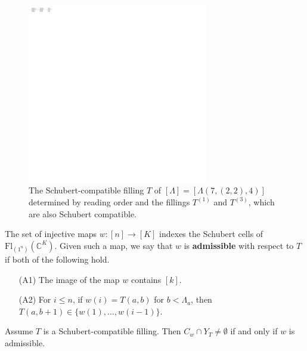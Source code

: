 \documentclass[12pt]{amsart}
\newcommand{\Fl}{\mathrm{Fl}}
\begin{document}
\begin{figure} 
    \centering
    \includegraphics[width=0.7\textwidth]{Figures/ReadingOrder.pdf}
    \caption{The Schubert-compatible filling $T$ of $[\Lambda] = [\Lambda(7,(2,2),4)]$ determined by reading order and the fillings $T^{(1)}$ and $T^{(3)}$, which are also Schubert compatible.}
    \label{fig:ReadingOrder}
\end{figure}




The set of injective maps $w:[n]\rightarrow [K]$ indexes the Schubert cells of $\Fl_{(1^n)}(\mathbb{C}^K)$.
Given such a map, we say that $w$ is {\bf admissible} with respect to $T$ if both of the following hold.
\begin{itemize}
    \item[(A1)] The image of the map $w$ contains $[k]$.%
    \item[(A2)] For $i\leq n$, if $w(i)=T(a,b)$ for $b<\Lambda_a$, then $T(a,b+1)\in \{w(1),\dots, w(i-1)\}$. 
\end{itemize}

\begin{lemma}\label{lem:NonemptyIntersections}
Assume $T$ is a Schubert-compatible filling.  Then  $C_w\cap Y_{T}\neq\emptyset$ if and only if $w$ is admissible.
\end{lemma}
\end{document}
